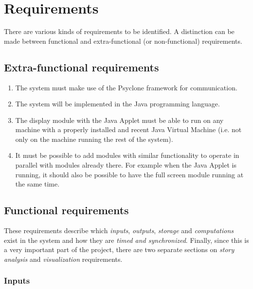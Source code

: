 \chapter{\label{cpt:requirements}Requirements}

There are various kinds of requirements to be identified. A distinction can be
made between functional and extra-functional (or non-functional) requirements.

\section{Extra-functional requirements}

\begin{enumerate}
  \item The system must make use of the Psyclone framework for communication.
  \item The system will be implemented in the Java programming language.
  \item The display module with the Java Applet must be able to run on any
    machine with a properly installed and recent Java Virtual Machine (i.e.
    not only on the machine running the rest of the system).
  \item It must be possible to add modules with similar functionality to
    operate in parallel with modules already there. For example when the Java
    Applet is running, it should also be possible to have the full screen
    module running at the same time. 
\end{enumerate}

\section{Functional requirements}

These requirements describe which \emph{inputs}, \emph{outputs}, \emph{storage}
and \emph{computations} exist in the system and how they are \emph{timed and
synchronized}. Finally, since this is a very important part of the project,
there are two separate sections on \emph{story analysis} and
\emph{visualization} requirements.

\subsection{Inputs}

